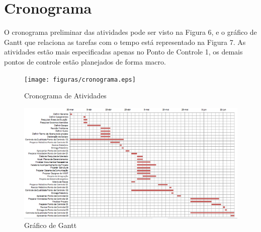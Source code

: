 \section{Cronograma}
O cronograma preliminar das atividades pode ser visto na Figura 6, e o gráfico de Gantt que relaciona as tarefas com o tempo está representado na Figura 7. As atividades estão mais especificadas apenas no Ponto de Controle 1, os demais pontos de controle estão planejados de forma macro.

 \begin{figure}[ht]
	\centering
		\texttt{[image: figuras/cronograma.eps]}
	\caption{Cronograma de Atividades}
\end{figure}

 \begin{figure}[ht]
	\centering
		\includegraphics[keepaspectratio=true,scale=0.9,angle=90]{figuras/gantt.eps}
	\caption{Gráfico de Gantt}
\end{figure}


